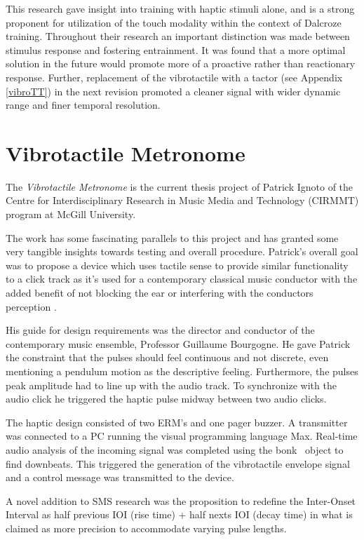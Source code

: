 This research gave insight into training with haptic stimuli alone, and is a strong proponent for utilization of the touch modality within the context of Dalcroze training. Throughout their research an important distinction was made between stimulus response and fostering entrainment. It was found that a more optimal solution in the future would promote more of a proactive rather than reactionary response. Further, replacement of the vibrotactile with a tactor (see Appendix \ref{vibroTT}) in the next revision promoted a cleaner signal with wider dynamic range and finer temporal resolution.

\section{Vibrotactile Metronome} \label{vibrotactileMetronome}
The \textit{Vibrotactile Metronome} is the current thesis project of Patrick Ignoto of the Centre for Interdisciplinary Research in Music Media and Technology (CIRMMT) program at McGill University.

The work has some fascinating parallels to this project and has granted some very tangible insights towards testing and overall procedure. Patrick’s overall goal was to propose a device which uses tactile sense to provide similar functionality to a click track as it’s used for a contemporary classical music conductor with the added benefit of not blocking the ear or interfering with the conductors perception \cite{ignoto2017development}.

His guide for design requirements was the director and conductor of the contemporary music ensemble, Professor Guillaume Bourgogne. He gave Patrick the constraint that the pulses should feel continuous and not discrete, even mentioning a pendulum motion as the descriptive feeling. Furthermore, the pulses peak amplitude had to line up with the audio track. To synchronize with the audio click he triggered the haptic pulse midway between two audio clicks.

The haptic design consisted of two ERM’s and one pager buzzer. A transmitter was connected to a PC running the visual programming language Max. Real-time audio analysis of the incoming signal was completed using the bonk~ object to find downbeats. This triggered the generation of the vibrotactile envelope signal and a control message was transmitted to the device.

A novel addition to SMS research was the proposition to redefine the Inter-Onset Interval as half previous IOI (rise time) + half nexts IOI (decay time) in what is claimed as more precision to accommodate varying pulse lengths.

